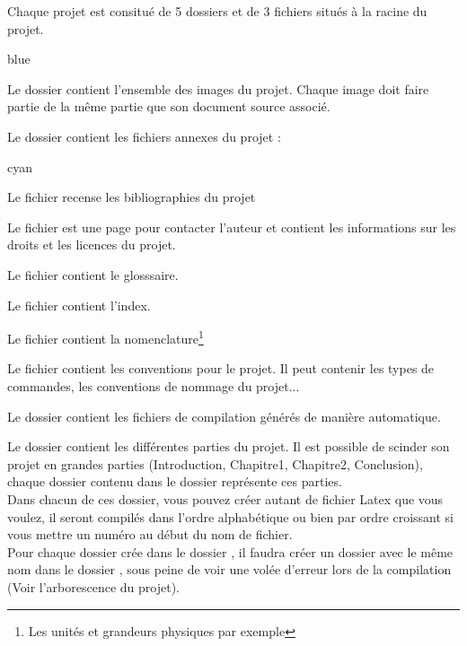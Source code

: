     Chaque projet est consitué de 5 dossiers et de 3 fichiers situés à la racine du projet.


    \begin{items}{blue}{\Triangle}
    \item Le dossier  contient l'ensemble des images du projet.
    Chaque image doit faire partie de la même partie que son document source associé.
    \item Le dossier  contient les fichiers annexes du projet : 
    \begin{items}{cyan}{\Triangle}
        \item Le fichier  recense les bibliographies du projet
        \item Le fichier  est une page pour contacter l'auteur et contient les informations sur les droits et les licences du projet.
        \item Le fichier  contient le glosssaire.
        \item Le fichier  contient l'index.
        \item Le fichier  contient la nomenclature\footnote{Les unités et grandeurs physiques par exemple}
        \item Le fichier  contient les conventions pour le projet. Il peut contenir les types de commandes, les conventions de nommage du projet...
    
    \end{items}
    \item Le dossier  contient les fichiers de compilation générés de manière automatique. 
    \item Le dossier  contient les différentes parties du projet. Il est possible de scinder son projet en grandes parties (Introduction, Chapitre1, Chapitre2, Conclusion), chaque dossier contenu dans le dossier  représente ces parties.\\

    Dans chacun de ces dossier, vous pouvez créer autant de fichier Latex que vous voulez, il seront compilés dans l'ordre alphabétique ou bien par ordre croissant si vous mettre un numéro au début du nom de fichier.\\

    Pour chaque dossier crée dans le dossier , il faudra créer un dossier avec le même nom dans le dossier , sous peine de voir une volée d'erreur lors de la compilation (Voir l'arborescence du projet).
    

\end{items}
